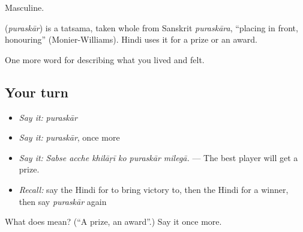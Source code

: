 Masculine.

\begin{cousinweb}
\textbf{} (\emph{puraskār}) is a tatsama, taken whole from Sanskrit \emph{puraskāra}, \textquotedblleft{}placing in front, honouring\textquotedblright{} (Monier-Williams). Hindi uses it for a prize or an award.
\end{cousinweb}

\begin{grammarlens}[title={What you've built}]
One more word for describing what you lived and felt.
\end{grammarlens}

\subsection*{Your turn}
\begin{itemize}
\raggedright
  \item \emph{Say it:} \emph{puraskār}
  \item \emph{Say it:} \emph{puraskār}, once more
  \item \emph{Say it:} \emph{Sabse acche khilāṛī ko puraskār milegā.} — The best player will get a prize.
  \item \emph{Recall:} say the Hindi for to bring victory to, then the Hindi for a winner, then say \emph{puraskār} again
\end{itemize}

\begin{tcolorbox}[breakable,colback=teal!4,colframe=teal!35!black,title={Before you move on}]
What does  mean? (\textquotedblleft{}A prize, an award\textquotedblright{}.) Say it once more.
\end{tcolorbox}
